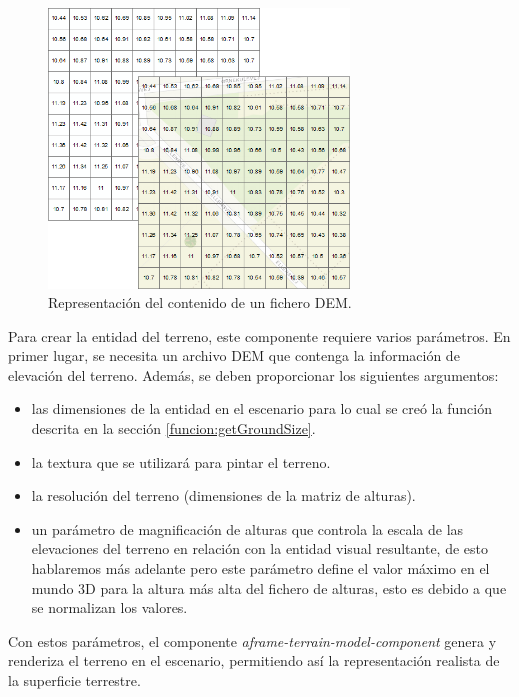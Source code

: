 \documentclass[a4paper, 11pt]{book}
\begin{document}
\begin{figure}[h]
  \centering
  \includegraphics[width=8cm, keepaspectratio]{img/dem.png}
  \caption{Representación del contenido de un fichero DEM.}
  \label{fig:dem}
\end{figure}

Para crear la entidad del terreno, este componente requiere varios parámetros. En primer lugar, se necesita un archivo DEM que contenga la información de elevación del terreno. Además, se deben proporcionar los siguientes argumentos:
\begin{itemize}
	\item las dimensiones de la entidad en el escenario para lo cual se creó la función descrita en la sección \ref{funcion:getGroundSize}.
	\item la textura que se utilizará para pintar el terreno.
	\item la resolución del terreno (dimensiones de la matriz de alturas).
	\item un parámetro de magnificación de alturas que controla la escala de las elevaciones del terreno en relación con la entidad visual resultante, de esto hablaremos más adelante pero este parámetro define el valor máximo en el mundo 3D para la altura más alta del fichero de alturas, esto es debido a que se normalizan los valores.
\end{itemize}
Con estos parámetros, el componente \emph{aframe-terrain-model-component} genera y renderiza el terreno en el escenario, permitiendo así la representación realista de la superficie terrestre.
\end{document}
